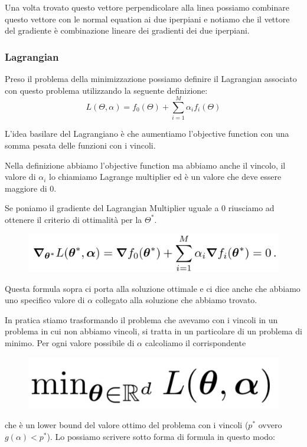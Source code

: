 \documentclass[14pt]{extreport}
\begin{document}
Una volta trovato questo vettore perpendicolare alla linea possiamo combinare questo vettore con le normal equation ai due iperpiani e notiamo che il
vettore del gradiente è combinazione lineare dei gradienti dei due iperpiani.

\subsubsection{Lagrangian}

Preso il problema della minimizzazione possiamo definire il Lagrangian associato con questo problema utilizzando la seguente definizione: $$L(\Theta,
	\alpha) = f_0(\Theta) + \sum_{i=1}^M \alpha_i f_i(\Theta)$$

L'idea basilare del Lagrangiano è che aumentiamo l'objective function con una somma pesata delle funzioni con i vincoli.


Nella definizione abbiamo l'objective function ma abbiamo anche il vincolo, il valore di $\alpha_i$ lo chiamiamo Lagrange multiplier ed è un valore
che deve essere maggiore di 0.

Se poniamo il gradiente del Lagrangian Multiplier uguale a 0 riusciamo ad ottenere il criterio di ottimalità per la $\Theta^*$.

\begin{figure}[H]
	\centering
	\includegraphics[width=0.7\linewidth]{299.jpeg}
\end{figure}

Questa formula sopra ci porta alla soluzione ottimale e ci dice anche che abbiamo uno specifico valore di $\alpha$ collegato alla soluzione che
abbiamo trovato.


In pratica stiamo trasformando il problema che avevamo con i vincoli in un problema in cui non abbiamo vincoli, si tratta in un particolare di un
problema di minimo. Per ogni valore possibile di $\alpha$ calcoliamo il corrispondente \begin{figure}[H]
	\centering
	\includegraphics[width=0.3\linewidth]{300.jpeg}
\end{figure}

che è un lower bound del valore ottimo del problema con i vincoli ($p^*$ ovvero $g(\alpha) < p^*$). Lo possiamo scrivere sotto forma di formula in
questo modo:
\end{document}
